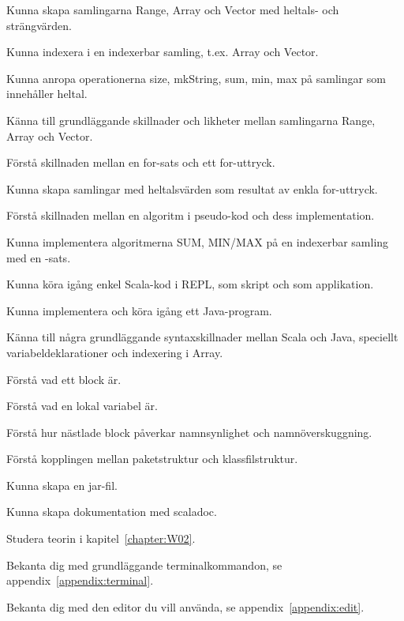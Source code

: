
\Exercise{\ExeWeekTWO}

\begin{Goals}
\item Kunna skapa samlingarna Range, Array och Vector med heltals- och strängvärden.
\item Kunna indexera i en indexerbar samling, t.ex. Array och Vector.
\item Kunna anropa operationerna size, mkString, sum, min, max på samlingar som innehåller heltal.
\item Känna till grundläggande skillnader och likheter mellan samlingarna Range, Array och Vector.
\item Förstå skillnaden mellan en for-sats och ett for-uttryck.
\item Kunna skapa samlingar med heltalsvärden som resultat av enkla for-uttryck.
\item Förstå skillnaden mellan en algoritm i pseudo-kod och dess implementation.
\item Kunna implementera algoritmerna SUM, MIN/MAX på en indexerbar samling med en -sats.
\item Kunna köra igång enkel Scala-kod i REPL, som skript och som applikation.
\item Kunna implementera och köra igång ett Java-program. 
\item Känna till några grundläggande syntaxskillnader mellan Scala och Java, speciellt variabeldeklarationer och indexering i Array. 
\item Förstå vad ett block är.
\item Förstå vad en lokal variabel är.
\item Förstå hur nästlade block påverkar namnsynlighet och namnöverskuggning.
\item Förstå kopplingen mellan paketstruktur och klassfilstruktur.
\item Kunna skapa en jar-fil.
\item Kunna skapa dokumentation med scaladoc.
\end{Goals}

\begin{Preparations}
\item Studera teorin i kapitel~\ref{chapter:W02}.
\item Bekanta dig med grundläggande terminalkommandon, se appendix~\ref{appendix:terminal}. 
\item Bekanta dig med den editor du vill använda, se appendix~\ref{appendix:edit}.
\end{Preparations}


